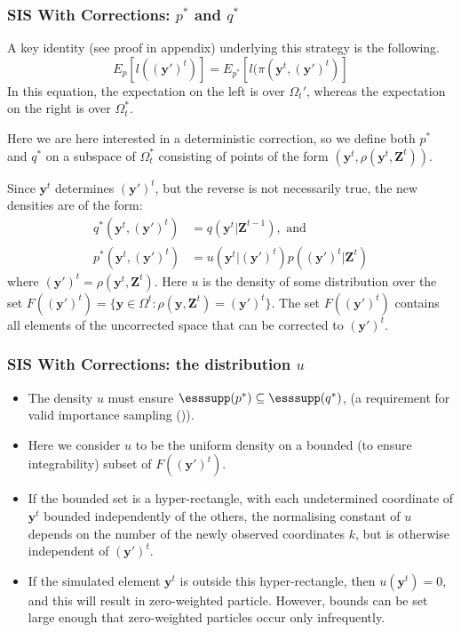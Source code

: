 \documentclass[9pt, xcolor={dvipsnames,svgnames,table}]{beamer}
\begin{document}
\begin{frame}
    \frametitle{SIS With Corrections: $p^*$ and $q^*$}
    A key identity (see proof in appendix) underlying this strategy is the following.
    \begin{equation*}
        E_{p}[l(\bm{(y')}^{t})]  =  E_{p^*}[l(\pi (\bm{y}^{t}, \bm{(y')}^{t})]
    \end{equation*}
    In this equation, the expectation on the left is over $\Omega_t'$, whereas the expectation on the right is over $\Omega_t^*$.
    
    Here we are here interested in a deterministic correction, so we define both $p^*$ and $q^*$ on a subspace of $\Omega_t^*$ consisting of points of the form $(\bm{y}^{t}, \rho(\bm{y}^{t}, \bm{Z}^{t}))$.
    
    Since $\bm{y}^{t}$ determines $\bm{(y')}^{t}$, but the reverse is not necessarily true, the new densities are of the form:
    \begin{align*}
        q^*(\bm{y}^{t},\bm{(y')}^{t}) &= q(\bm{y}^{t} | \bm{Z}^{t-1}), \mbox{ and } \\
        p^*(\bm{y}^{t},\bm{(y')}^{t}) &= u(\bm{y}^{t} | \bm{(y')}^{t}) p(\bm{(y')}^{t} | \bm{Z}^{t})
    \end{align*}
    where $\bm{(y')}^{t} = \rho(\bm{y}^{t}, \bm{Z}^{t})$. Here $u$ is the density of some distribution over the set $F(\bm{(y')}^{t}) = \{ \bm{y} \in \Omega^t  :  \rho(\bm{y}, \bm{Z}^{t}) = \bm{(y')}^{t}\}$.
    The set $F(\bm{(y')}^{t})$ contains all elements of the uncorrected space that can be corrected to $\bm{(y')}^{t}$.
\end{frame}





\begin{frame}
    \frametitle{SIS With Corrections: the distribution $u$}
    \begin{itemize}
        \item The density $u$ must ensure $\esssupp(p^*) \subseteq \esssupp(q^*)$, (a requirement for valid importance sampling (\cite{Geweke})).
        \item Here we consider $u$ to be the uniform density on a bounded (to ensure integrability) subset of $F(\bm{(y')}^{t})$.
        \item If the bounded set is a hyper-rectangle, with each undetermined coordinate of $\bm{y}^{t}$ bounded independently of the others, the normalising constant of $u$ depends on the number of the newly observed coordinates $k$, but is otherwise independent of $\bm{(y')}^{t}$.
        \item If the simulated element $\bm{y}^t$ is outside this hyper-rectangle, then $u(\bm{y}^t) = 0$, and this will result in zero-weighted particle. However, bounds can be set large enough that zero-weighted particles occur only infrequently.
    \end{itemize}
       
\end{frame}
\end{document}
